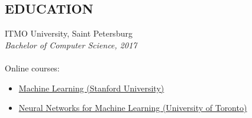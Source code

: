 \documentclass[margin]{cv}
\begin{document}
\begin{resume}
\section{EDUCATION} 
ITMO University, Saint Petersburg \\
{\sl Bachelor of Computer Science, 2017} \\\\
Online courses:
\begin{itemize} 
    \itemsep-2pt 
    \itemindent-10pt
    \item \href{https://www.coursera.org/account/accomplishments/verify/NAC3H6WDW9TL}{Machine Learning (Stanford University)}
    \item \href{https://www.coursera.org/account/accomplishments/verify/2LMELT5R6D25}{Neural Networks for Machine Learning (University of Toronto)}
\end{itemize}

\end{resume}
\end{document}
